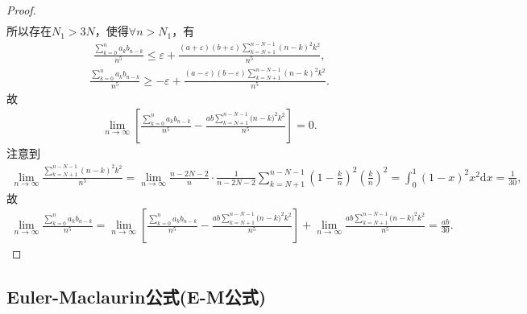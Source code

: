 \documentclass[../../main.tex]{subfiles}%
\begin{document}
\begin{proof}
\begin{align*}
\end{align*}
所以存在$N_1>3N$，使得$\forall n>N_1$，有
\begin{align*}
\frac{\sum\limits_{k=0}^n a_kb_{n-k}}{n^5}\leqslant \varepsilon +\frac{(a+\varepsilon)(b+\varepsilon) \sum\limits_{k=N+1}^{n-N-1} (n-k)^2k^2}{n^5},
\end{align*}
\begin{align*}
\frac{\sum\limits_{k=0}^n a_kb_{n-k}}{n^5}\geqslant -\varepsilon +\frac{(a-\varepsilon)(b-\varepsilon) \sum\limits_{k=N+1}^{n-N-1} (n-k)^2k^2}{n^5}.
\end{align*}
故
\begin{align*}
\lim_{n\rightarrow \infty} \left[ \frac{\sum\limits_{k=0}^n{a_kb_{n-k}}}{n^5}-\frac{ab\sum\limits_{k=N+1}^{n-N-1}{(n}-k)^2k^2}{n^5} \right] =0.
\end{align*}
注意到
\begin{align*}
\lim\limits_{n\rightarrow \infty}\frac{\sum\limits_{k=N+1}^{n-N-1} (n-k)^2k^2}{n^5}=\lim\limits_{n\rightarrow \infty}\frac{n-2N-2}{n}\cdot \frac{1}{n-2N-2}\sum\limits_{k=N+1}^{n-N-1} \left(1-\frac{k}{n}\right)^2\left( \frac{k}{n} \right)^2
=\int_0^1 (1-x)^2x^2\mathrm{d}x=\frac{1}{30},
\end{align*}
故
\begin{align*}
\lim_{n\rightarrow \infty} \frac{\sum\limits_{k=0}^n{a_kb_{n-k}}}{n^5}=\lim_{n\rightarrow \infty} \left[ \frac{\sum\limits_{k=0}^n{a_kb_{n-k}}}{n^5}-\frac{ab\sum\limits_{k=N+1}^{n-N-1}{(n}-k)^2k^2}{n^5} \right] +\lim_{n\rightarrow \infty} \frac{ab\sum\limits_{k=N+1}^{n-N-1}{(n}-k)^2k^2}{n^5}=\frac{ab}{30}.
\end{align*}

\end{proof}



\subsection{Euler-Maclaurin公式(E-M公式)}
\end{document}
